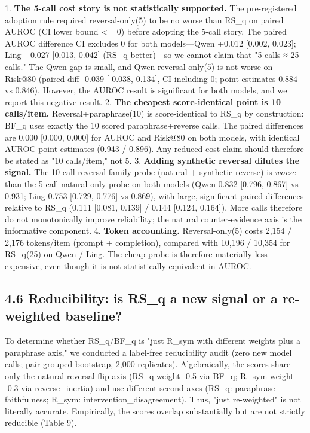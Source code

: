 \documentclass[11pt]{article}
\begin{document}
1. \textbf{The 5-call cost story is not statistically supported.} The pre-registered adoption rule required reversal-only(5) to be no worse than RS\_q on paired AUROC (CI lower bound <= 0) before adopting the 5-call story. The paired AUROC difference CI excludes 0 for both models—Qwen +0.012 [0.002, 0.023]; Ling +0.027 [0.013, 0.042] (RS\_q better)—so we cannot claim that "5 calls ≈ 25 calls." The Qwen gap is small, and Qwen reversal-only(5) is not worse on Risk@80 (paired diff -0.039 [-0.038, 0.134], CI including 0; point estimates 0.884 vs 0.846). However, the AUROC result is significant for both models, and we report this negative result.
2. \textbf{The cheapest score-identical point is 10 calls/item.} Reversal+paraphrase(10) is score-identical to RS\_q by construction: BF\_q uses exactly the 10 scored paraphrase+reverse calls. The paired differences are 0.000 [0.000, 0.000] for AUROC and Risk@80 on both models, with identical AUROC point estimates (0.943 / 0.896). Any reduced-cost claim should therefore be stated as "10 calls/item," not 5.
3. \textbf{Adding synthetic reversal dilutes the signal.} The 10-call reversal-family probe (natural + synthetic reverse) is \emph{worse} than the 5-call natural-only probe on both models (Qwen 0.832 [0.796, 0.867] vs 0.931; Ling 0.753 [0.729, 0.776] vs 0.869), with large, significant paired differences relative to RS\_q (0.111 [0.081, 0.139] / 0.144 [0.124, 0.164]). More calls therefore do not monotonically improve reliability; the natural counter-evidence axis is the informative component.
4. \textbf{Token accounting.} Reversal-only(5) costs 2,154 / 2,176 tokens/item (prompt + completion), compared with 10,196 / 10,354 for RS\_q(25) on Qwen / Ling. The cheap probe is therefore materially less expensive, even though it is not statistically equivalent in AUROC.

\subsection{4.6 Reducibility: is RS\_q a new signal or a re-weighted baseline?}

To determine whether RS\_q/BF\_q is "just R\_sym with different weights plus a paraphrase axis," we conducted a label-free reducibility audit (zero new model calls; pair-grouped bootstrap, 2,000 replicates). Algebraically, the scores share only the natural-reversal flip axis (RS\_q weight -0.5 via BF\_q; R\_sym weight -0.3 via reverse\_inertia) and use different second axes (RS\_q: paraphrase faithfulness; R\_sym: intervention\_disagreement). Thus, "just re-weighted" is not literally accurate. Empirically, the scores overlap substantially but are not strictly reducible (Table 9).
\end{document}
